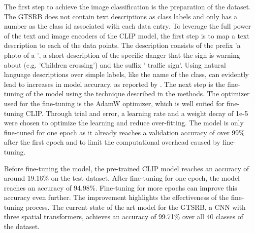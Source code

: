 \documentclass{article}
\begin{document}
The first step to achieve the image classification is the preparation of the dataset. The GTSRB does not contain text descriptions as class labels and only has a number as the class id associated with each data entry. To leverage the full power of the text and image encoders of the CLIP model, the first step is to map a text description to each of the data points. The description consists of the prefix 'a photo of a ', a short description of the specific danger that the sign is warning about (e.g. 'Children crossing') and the suffix ' traffic sign'. Using natural language descriptions over simple labels, like the name of the class, can evidently lead to increases in model accuracy, as reported by \citet{radford2021learningtransferablevisualmodels}. The next step is the fine-tuning of the model using the technique described in the methods. The optimizer used for the fine-tuning is the AdamW optimizer, which is well suited for fine-tuning CLIP. \cite{loshchilov2019decoupledweightdecayregularization} Through trial and error, a learning rate and a weight decay of 1e-5 were chosen to optimize the learning and reduce over-fitting. The model is only fine-tuned for one epoch as it already reaches a validation accuracy of over 99\% after the first epoch and to limit the computational overhead caused by fine-tuning. 

Before fine-tuning the model, the pre-trained CLIP model reaches an accuracy of around 19.16\% on the test dataset. After fine-tuning for one epoch, the model reaches an accuracy of 94.98\%. Fine-tuning for more epochs can improve this accuracy even further. The improvement highlights the effectiveness of the fine-tuning process. The current state of the art model for the GTSRB, a CNN with three spatial transformers, achieves an accuracy of 99.71\% over all 40 classes of the dataset. \cite{arcos2018deep}
\end{document}
